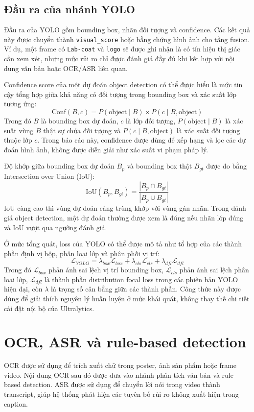 \subsection{Đầu ra của nhánh YOLO}
Đầu ra của YOLO gồm bounding box, nhãn đối tượng và confidence. Các kết quả này được chuyển thành \texttt{visual\_score} hoặc bằng chứng hình ảnh cho tầng fusion. Ví dụ, một frame có \texttt{Lab-coat} và \texttt{logo} sẽ được ghi nhận là có tín hiệu thị giác cần xem xét, nhưng mức rủi ro chỉ được đánh giá đầy đủ khi kết hợp với nội dung văn bản hoặc OCR/ASR liên quan.

Confidence score của một dự đoán object detection có thể được hiểu là mức tin cậy tổng hợp giữa khả năng có đối tượng trong bounding box và xác suất lớp tương ứng:
\[
\mathrm{Conf}(B,c)
= P(\mathrm{object}\mid B)\times P(c\mid B,\mathrm{object})
\]
Trong đó \(B\) là bounding box dự đoán, \(c\) là lớp đối tượng, \(P(\mathrm{object}\mid B)\) là xác suất vùng \(B\) thật sự chứa đối tượng và \(P(c\mid B,\mathrm{object})\) là xác suất đối tượng thuộc lớp \(c\). Trong báo cáo này, confidence được dùng để xếp hạng và lọc các dự đoán hình ảnh, không được diễn giải như xác suất vi phạm pháp lý.

Độ khớp giữa bounding box dự đoán \(B_p\) và bounding box thật \(B_{gt}\) được đo bằng Intersection over Union (IoU):
\[
\mathrm{IoU}(B_p, B_{gt}) =
\frac{|B_p \cap B_{gt}|}{|B_p \cup B_{gt}|}
\]
IoU càng cao thì vùng dự đoán càng trùng khớp với vùng gán nhãn. Trong đánh giá object detection, một dự đoán thường được xem là đúng nếu nhãn lớp đúng và IoU vượt qua ngưỡng đánh giá.

Ở mức tổng quát, loss của YOLO có thể được mô tả như tổ hợp của các thành phần định vị hộp, phân loại lớp và phân phối vị trí:
\[
\mathcal{L}_{YOLO}
= \lambda_{box}\mathcal{L}_{box}
+ \lambda_{cls}\mathcal{L}_{cls}
+ \lambda_{dfl}\mathcal{L}_{dfl}
\]
Trong đó \(\mathcal{L}_{box}\) phản ánh sai lệch vị trí bounding box, \(\mathcal{L}_{cls}\) phản ánh sai lệch phân loại lớp, \(\mathcal{L}_{dfl}\) là thành phần distribution focal loss trong các phiên bản YOLO hiện đại, còn \(\lambda\) là trọng số cân bằng giữa các thành phần. Công thức này được dùng để giải thích nguyên lý huấn luyện ở mức khái quát, không thay thế chi tiết cài đặt nội bộ của Ultralytics.

\section{OCR, ASR và rule-based detection}
OCR được sử dụng để trích xuất chữ trong poster, ảnh sản phẩm hoặc frame video. Nội dung OCR sau đó được đưa vào nhánh phân tích văn bản và rule-based detection. ASR được sử dụng để chuyển lời nói trong video thành transcript, giúp hệ thống phát hiện các tuyên bố rủi ro không xuất hiện trong caption.

